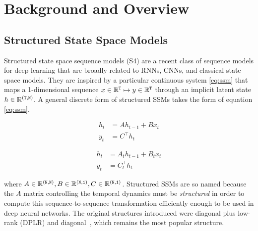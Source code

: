 \section{Background and Overview}
\label{sec:background}


\subsection{Structured State Space Models}


Structured state space sequence models (S4) are a recent class of sequence models for deep learning that are broadly related to RNNs, CNNs,
and classical state space models.
They are inspired by a particular continuous system \eqref{eq:ssm}
that maps a 1-dimensional sequence $x \in \mathbb{R}^\mathtt{T} \mapsto y \in \mathbb{R}^\mathtt{T}$ through an implicit latent state \( h \in \mathbb{R}^{\mathtt{(T, N)}} \). %
\iftoggle{arxiv}{

}{}
A general discrete form of structured SSMs takes the form of equation \eqref{eq:ssm}.
\begin{center}
  \vspace*{-1em}
\begin{minipage}[t]{.45\linewidth}
\begin{subequations}
  \label{eq:ssm}
  \begin{align}
  \label{eq:ssm:1}
    h_{t} &= A h_{t-1} + B x_t \\
  \label{eq:ssm:2}
    y_t &= C^{\top} h_t
  \end{align}
\end{subequations}
\end{minipage}
\qquad
\begin{minipage}[t]{.45\linewidth}
\begin{subequations}
  \label{eq:s6}
  \begin{align}
  \label{eq:s6:1}
    h_{t} &= A_t h_{t-1} + B_t x_t \\
  \label{eq:s6:2}
    y_t &= C_t^{\top} h_t
  \end{align}
\end{subequations}
\end{minipage}
\end{center}

where $A \in \mathbb{R}^{\mathtt{(N,N)}}, B \in \mathbb{R}^{\mathtt{(N,1)}}, C \in \mathbb{R}^{\mathtt{(N,1)}}$.
Structured SSMs are so named because the $A$ matrix controlling the temporal dynamics must be \emph{structured} in order to compute this sequence-to-sequence transformation efficiently enough to be used in deep neural networks.
The original structures introduced were diagonal plus low-rank (DPLR) \citep{gu2022efficiently} and diagonal~\citep{gupta2022diagonal,gu2022parameterization,smith2023s5}, which remains the most popular structure.


